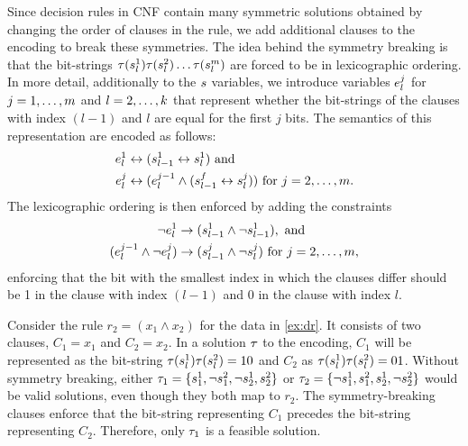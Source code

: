 Since decision rules in CNF contain many symmetric solutions obtained by changing the order of clauses in the rule, we add additional clauses to the encoding to break these symmetries.
The idea behind the symmetry breaking is that the bit-strings $\tau(s_l^1)\tau(s_l^2)\dots\tau(s_l^m)$ are forced to be in lexicographic ordering.
In more detail, additionally to the $s$ variables, we introduce variables $e_l^j$ for $j=1,\dots,m$ and $l=2,\dots,k$ that represent whether the bit-strings of the clauses with index $(l-1)$ and $l$ are equal for the first $j$ bits.
The semantics of this representation are encoded as follows:
\begin{align*}
  \equals_l^1 &\leftrightarrow (\selector_{l-1}^1 \leftrightarrow \selector_l^1)\ \text{and} \\
  \equals_l^j &\leftrightarrow (\equals_l^{j-1} \land (\selector_{l-1}^f \leftrightarrow \selector_l^j))\ \text{for}\ j=2,\dots,\nfeat.
\end{align*}
The lexicographic ordering is then enforced by adding the constraints
\begin{align*}
  \lnot \equals_l^1 &\rightarrow (\selector_{l-1}^1 \land \lnot \selector_{l-1}^1),\ \text{and} \\
  (\equals_l^{j-1} \land \lnot \equals_l^j) &\rightarrow (\selector_{l-1}^j \land \lnot \selector_l^j)\ \text{for}\ j=2,\dots,\nfeat,
\end{align*}
enforcing that the bit with the smallest index in which the clauses differ should be 1 in the clause with index $(l-1)$ and 0 in the clause with index $l$.

\begin{example}
  Consider the rule $r_2 = (x_1 \land x_2)$ for the data in \cref{ex:dr}.
  It consists of two clauses, $C_1 = x_1$ and $C_2 = x_2$.
  In a solution $\tau$ to the encoding, $C_1$ will be represented as the bit-string $\tau(s_l^1)\tau(s_l^2)=10$ and $C_2$ as $\tau(s_l^1)\tau(s_l^2)=01$.
  Without symmetry breaking, either $\tau_1 = \{s_1^1, \lnot s_1^2, \lnot s_2^1, s_2^2\}$ or $\tau_2 = \{\lnot s_1^1, s_1^2, s_2^1, \lnot s_2^2\}$ would be valid solutions, even though they both map to $r_2$.
  The symmetry-breaking clauses enforce that the bit-string representing $C_1$ precedes the bit-string representing $C_2$.
  Therefore, only $\tau_1$ is a feasible solution.
\end{example}

